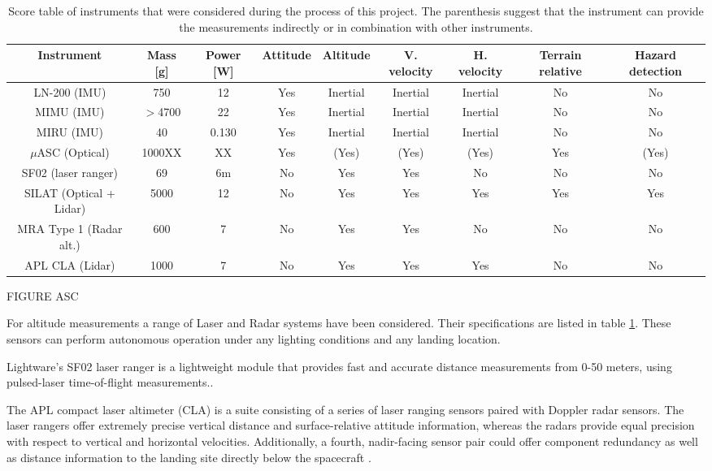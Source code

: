 \begin{table}
\begin{flushleft}

\begin{tabular}{|c|c|c|c|c|c|c|c|c|}
\hline 
Instrument & Mass [g] & Power [W] &Attitude & Altitude & V. velocity & H. velocity & Terrain relative & Hazard detection\\ 
\hline
LN-200 (IMU) & 750 & 12 & Yes & Inertial & Inertial & Inertial & No & No\\
\hline
MIMU (IMU) & $>$4700 & 22 & Yes& Inertial & Inertial & Inertial & No & No\\
\hline

MIRU (IMU)& 40 & 0.130 & Yes& Inertial & Inertial & Inertial & No & No\\
\hline
$\mu$ASC (Optical)  & 1000XX & XX& Yes & (Yes) & (Yes) & (Yes) & Yes & (Yes)\\
\hline
SF02 (laser ranger) & 69  & 6m & No & Yes  & Yes & No & No & No\\
\hline
SILAT (Optical + Lidar) & 5000  & 12 & No & Yes & Yes & Yes & Yes & Yes \\
\hline
MRA Type 1 (Radar alt.) & 600 & 7& No & Yes  & Yes & No & No & No \\
\hline
APL CLA (Lidar) & 1000 & 7 & No & Yes & Yes & Yes & No& No \\
\hline

 

\end{tabular}
\caption{Score table of instruments that were considered during the process of this project. The parenthesis suggest that the instrument can provide the measurements indirectly or in combination with other instruments. }
\label{tab:sensors}
\end{flushleft}
\end{table}


FIGURE ASC



For altitude measurements a range of Laser and Radar systems have been considered. Their specifications are listed in table \ref{tab:sensors}. These sensors can perform autonomous operation under any lighting conditions and any landing location.

Lightware’s SF02 laser ranger is a lightweight module that provides fast and accurate distance measurements from 0-50 meters, using pulsed-laser time-of-flight measurements.\cite{https://www.parallax.com/product/28043}. 

The APL compact laser altimeter (CLA) is a suite consisting of a series of laser ranging sensors paired with  Doppler radar sensors. The laser rangers offer extremely precise vertical distance and surface-relative attitude information, whereas the radars provide equal precision with respect to vertical and horizontal velocities. Additionally, a fourth, nadir-facing sensor pair could offer component redundancy as well as distance information to the landing site directly below the spacecraft \cite{http://www.jhuapl.edu/techdigest/TD/td3004/30_4-Bruzzi.pdf}. 


